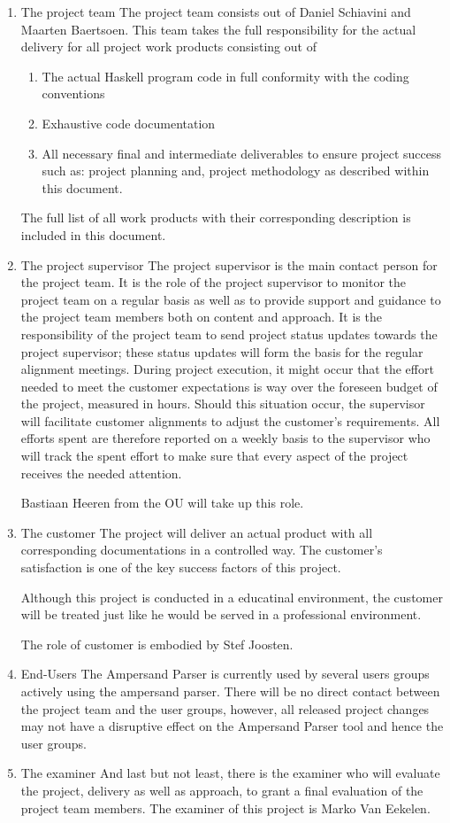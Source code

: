 \begin{enumerate}
	\item The project team
	The project team consists out of Daniel Schiavini and Maarten Baertsoen.
	This team takes the full responsibility for the actual delivery for all project work products consisting out of
	\begin{enumerate}
		\item The actual Haskell program code in full conformity with the coding conventions
		\item Exhaustive code documentation
		\item All necessary final and intermediate deliverables to ensure project success such as: project planning and, project methodology as described within this document. 
	\end {enumerate}
	The full list of all work products with their corresponding description is included in this document.
	\item The project supervisor
	The project supervisor is the main contact person for the project team. It is the role of the project supervisor to monitor the project team on a regular basis as well as to provide support and guidance to the project team members both on content and approach.
	It is the responsibility of the project team to send project status updates towards the project supervisor; these status updates will form the basis for the regular alignment meetings. 
	During project execution, it might occur that the effort needed to meet the customer expectations is way over the foreseen budget of the project, measured in hours. 
	Should this situation occur, the supervisor will facilitate customer alignments to adjust the customer’s requirements.
	All efforts spent are therefore reported on a weekly basis to the supervisor who will track the spent effort to make sure that every aspect of the project receives the needed attention.


	Bastiaan Heeren from the OU will take up this role.
	\item The customer
	The project will deliver an actual product with all corresponding documentations in a controlled way. 
	The customer's satisfaction is one of the key success factors of this project.

	Although this project is conducted in a educatinal environment, the customer will be treated just like he would be served in a professional environment. 

	The role of customer is embodied by Stef Joosten.
	\item End-Users
	The Ampersand Parser is currently used by several users groups actively using the ampersand parser. There will be no direct contact between the project team and the user groups, however, all released project changes may not have a disruptive effect on the Ampersand Parser tool and hence the user groups. 
	\item The examiner
	And last but not least, there is the examiner who will evaluate the project, delivery as well as approach, to grant a final evaluation of the project team members. The examiner of this project is Marko Van Eekelen.
\end {enumerate}


